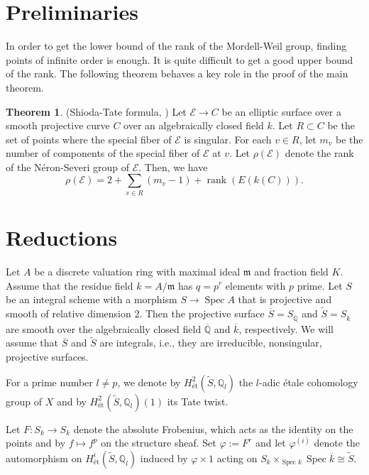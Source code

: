 \documentclass[a4paper]{jarticle} %
\theoremstyle{definition}
\newtheorem{thm}{Theorem}[section]
\theoremstyle{remark}
\DeclareMathOperator{\rank}{rank}
\DeclareMathOperator{\Spec}{Spec}
\newcommand{\Neron}{N\'eron}
\begin{document}
\section{Preliminaries}

In order to get the lower bound of the rank of the Mordell-Weil group, finding points of infinite order is enough.
It is quite difficult to get a good upper bound of the rank.
The following theorem behaves a key role in the proof of the main theorem.
\begin{thm}{(Shioda-Tate formula, \cite[Corollary 5.3]{ref:shioda1990})}
    \label{thm:shioda}
    Let $\mathcal{E} \to C$ be an elliptic surface over a smooth projective curve $C$ over an algebraically closed field $k$.
    Let $R \subset C$ be the set of points where the special fiber of $\mathcal{E}$ is singular.
    For each $v \in R$, let $m_{v}$ be the number of components of the special fiber of $\mathcal{E}$ at $v$.
    Let $\rho(\mathcal{E})$ denote the rank of the \Neron-Severi group of $\mathcal{E}$.
    Then, we have
    \begin{equation*}
        \rho (\mathcal{E}) = 2 + \sum_{v \in R} (m_{v} - 1) + \rank(E(k(C))).
    \end{equation*}
\end{thm}

\section{Reductions}
Let $A$ be a discrete valuation ring with maximal ideal $\mathfrak{m}$ and fraction field $K$.
Assume that the residue field $k=A/\mathfrak{m}$ has $q=p^r$ elements with $p$ prime.
Let $S$ be an integral scheme with a morphism $S \to \Spec A$ that is projective and smooth of relative dimension $2$.
Then the projective surface $\overline{S}=S_{\overline{\mathbb{Q}}}$ and $\tilde{S}=S_{\overline{k}}$ are smooth over the algebraically closed field $\overline{\mathbb{Q}}$ and $\overline{k}$, respectively.
We will assume that $\overline{S}$ and $\tilde{S}$ are integrals, i.e., they are irreducible, nonsingular, projective surfaces.

For a prime number $l \neq p$, we denote by $H_{\text{\'et}}^{2}(\tilde{S}, \mathbb{Q}_l)$ the $l$-adic \'etale cohomology group of $X$ and by $H_{\text{\'et}}^{2}(\tilde{S}, \mathbb{Q}_l)(1)$ its Tate twist.

Let $F: S_k \to S_k$ denote the absolute Frobenius, which acts as the identity on the points and by $f \mapsto f^p$ on the structure sheaf.
Set $\varphi:=F^{r}$ and let $\varphi^{(i)}$ denote the automorphism on $H_{\text{\'et}}^{i}(\tilde{S}, \mathbb{Q}_l)$ induced by $\varphi \times 1$ acting on $S_k \times_{\Spec k} \Spec \overline{k} \cong \tilde{S}$.
\end{document}
